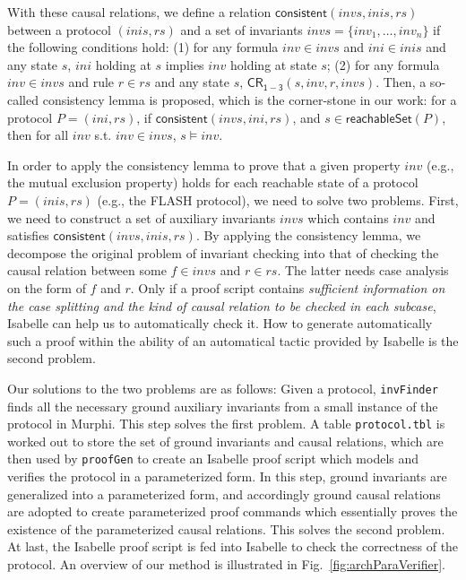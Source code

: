 \documentclass{llncs-new}
\begin{document}
With these causal relations, we define a   relation $\mathsf{consistent}( invs,inis, rs)$ between a protocol $(inis,rs)$ and a set of invariants $invs=\{inv_1,\ldots, inv_n\}$ if the following conditions hold: (1) for any formula $inv\in invs$ and $ini\in inis$ and any state $s$, $ini$ holding at
$s $ implies $inv$ holding at state $s $; (2)
  for any formula $inv\in invs$ and rule  $r \in rs$ and any state $s$,  $\mathsf{ CR_{1-3}}(s, inv, r, invs   )$. Then, a
so-called consistency lemma is proposed, which is the corner-stone in our work: %
 for a protocol $P=(ini,rs)$, if $\mathsf{consistent}( invs, ini, rs)$, and $s  \in \mathsf{reachableSet}(P)$, %
 then   for all $inv$ s.t. $inv \in invs$, $s \models inv $.



In order to  apply the consistency lemma to prove that a given property $inv$ (e.g., the mutual exclusion property) holds for each reachable state of a protocol $P=(inis,rs)$ (e.g., the FLASH  protocol), we need to solve two problems. First, we need to construct a set of auxiliary invariants $invs$ which contains $inv$ and satisfies  $\mathsf{consistent}( invs, inis, rs)$.  By applying the consistency lemma, we  decompose the original problem of invariant checking into that of checking the causal relation between some $f\in invs$ and $r \in rs$. The latter needs   case analysis on the form of $f$ and $r$.  Only if a proof script contains \emph{sufficient information on the case splitting and  the kind of causal relation to be checked in each subcase}, Isabelle can help us to automatically  check it. How to  generate automatically such a proof within the ability of an automatical tactic provided by Isabelle is the second problem.

Our solutions to the two problems are as follows:
Given a protocol,  \texttt{invFinder} finds all the necessary ground auxiliary invariants from a small instance of the protocol in Murphi. This step solves the first  problem.
 A table {\tt protocol.tbl} is worked out  to store the set of ground invariants and
 causal relations, which are then  used by {\tt proofGen} to
create an Isabelle proof   script which models and verifies the
protocol in a parameterized form. In this step, ground invariants
are generalized into a parameterized form, and accordingly
ground causal relations are adopted to create parameterized
proof commands which essentially proves the existence of the
parameterized causal relations. This solves the second problem.  At last, the Isabelle proof script is
fed into Isabelle to check the correctness of the protocol.
An overview of our method is  illustrated in Fig.~\ref{fig:archParaVerifier}.
\end{document}
